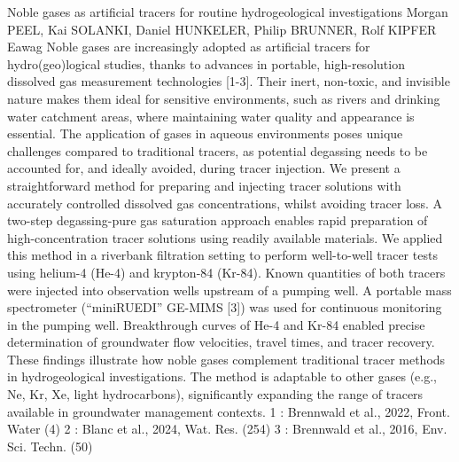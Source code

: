 \begin{conf-abstract}
{Noble gases as artificial tracers for routine hydrogeological investigations}
{Morgan PEEL, Kai SOLANKI, Daniel HUNKELER, Philip BRUNNER, Rolf KIPFER}
{Eawag}
{Noble gases are increasingly adopted as artificial tracers for hydro(geo)logical studies, thanks to advances in portable, high-resolution dissolved gas measurement technologies [1-3]. Their inert, non-toxic, and invisible nature makes them ideal for sensitive environments, such as rivers and drinking water catchment areas, where maintaining water quality and appearance is essential. The application of gases in aqueous environments poses unique challenges compared to traditional tracers, as potential degassing needs to be accounted for, and ideally avoided, during tracer injection. We present a straightforward method for preparing and injecting tracer solutions with accurately controlled dissolved gas concentrations, whilst avoiding tracer loss. A two-step degassing-pure gas saturation approach enables rapid preparation of high-concentration tracer solutions using readily available materials. We applied this method in a riverbank filtration setting to perform well-to-well tracer tests using helium-4 (He-4) and krypton-84 (Kr-84). Known quantities of both tracers were injected into observation wells upstream of a pumping well. A portable mass spectrometer (“miniRUEDI” GE-MIMS [3]) was used for continuous monitoring in the pumping well. Breakthrough curves of He-4 and Kr-84 enabled precise determination of groundwater flow velocities, travel times, and tracer recovery. These findings illustrate how noble gases complement traditional tracer methods in hydrogeological investigations. The method is adaptable to other gases (e.g., Ne, Kr, Xe, light hydrocarbons), significantly expanding the range of tracers available in groundwater management contexts. 1 : Brennwald et al., 2022, Front. Water (4) 2 : Blanc et al., 2024, Wat. Res. (254) 3 : Brennwald et al., 2016, Env. Sci. Techn. (50)}
\end{conf-abstract}
